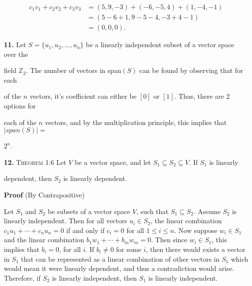 \documentclass[12pt, a4paper]{article}
\begin{document}
 \begin{equation*}
     \begin{split}
         c_1v_1+c_2v_2+c_3v_3& =(5,9,-3)+(-6,-5,4)+(1,-4,-1) \\
         & = (5-6+1,9-5-4,-3+4-1) \\
         & =(0,0,0).
     \end{split}
 \end{equation*}
 
 \noindent\textbf{11.} Let $S=\{u_1,u_2,\dots, u_n\}$ be a linearly independent subset of a vector space over the\par field $\mathbb{Z}_2$. The number of vectors in span$(S)$ can be found by observing that for each\par of the $n$ vectors, it's coefficient can either be $[0]$ or $[1]$. Thus, there are 2 options for\par each of the $n$ vectors, and by the multiplication principle, this implies that $|span(S)|=$\par $2^n$. 
 
 \vspace{6mm}
 
 \noindent\textbf{12.} \textsc{Theorem 1.6} Let $V$ be a vector space, and let $S_1\subseteq S_2\subseteq V$. If $S_1$ is linearly\par dependent,  then $S_2$ is linearly dependent.
 
 \vspace{4mm}
 
 \begin{addmargin}[1.4em]{1.4em}
 
    \noindent\textbf{Proof} (By Contrapositive)
    
    \vspace{2mm}
    
    \noindent Let $S_1$ and $S_2$ be subsets of a vector space $V$, such that $S_1\subseteq S_2$. Assume $S_2$ is linearly independent. Then for all vectors $u_i\in S_2$, the linear combination $c_1u_1+\cdots +c_nu_n=0$ if and only if $c_i=0$ for all $1\leq i\leq n$. Now suppose $w_i\in S_1$ and the linear combination $b_1w_1+\cdots +b_mw_m=0$. Then since $w_i\in S_1$, this implies that $b_i=0$, for all $i$. If $b_i\neq 0$ for some $i$, then there would exists a vector in $S_1$ that can be represented as a linear combination of other vectors in $S_1$ which would mean it were linearly dependent, and thus a contradiction would arise. Therefore, if $S_2$ is linearly independent, then $S_1$ is linearly independent.\hspace{35mm}\blacksquare
 
 \end{addmargin}
 
\end{document}

